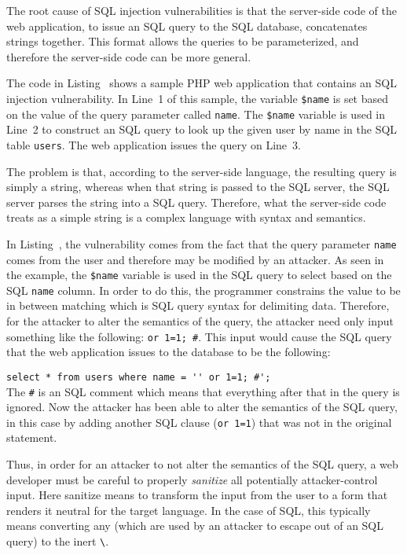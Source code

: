 The root cause of SQL injection vulnerabilities is that the
server-side code of the web application, to issue an SQL query to the
SQL database, concatenates strings together. This format allows the
queries to be parameterized, and therefore the server-side code can be
more general.



The code in Listing~ shows a sample PHP web
application that contains an SQL injection vulnerability. In Line~1 of
this sample, the variable \texttt{\$name} is set based on the value of
the query parameter called \texttt{name}. The \texttt{\$name} variable
is used in Line~2 to construct an SQL query to look up the given user
by name in the SQL table \texttt{users}. The web application issues
the query on Line~3.

The problem is that, according to the server-side language, the
resulting query is simply a string, whereas when that string is passed
to the SQL server, the SQL server parses the string into a SQL query.
Therefore, what the server-side code treats as a simple string is a
complex language with syntax and semantics. 

In Listing~, the vulnerability comes from the
fact that the query parameter \texttt{name} comes from the user and
therefore may be modified by an attacker. As seen in the example, the
\texttt{\$name} variable is used in the SQL query to select based on
the SQL \texttt{name} column. In order to do this, the programmer
constrains the value to be in between matching
\texttt{\textquotesingle} which is SQL query syntax for delimiting
data. Therefore, for the attacker to alter the semantics of the query,
the attacker need only input something like the following:
\texttt{\textquotesingle or 1=1; \#}. This input would cause the
SQL query that the web application issues to the database to be
the following:

\noindent\lstinline!select * from users where name = '' or 1=1; #';!
\\

The \texttt{\#} is an SQL comment which means that everything after
that in the query is ignored. Now the attacker has been able to alter
the semantics of the SQL query, in this case by adding another SQL
clause (\texttt{or 1=1}) that was not in the original statement.

Thus, in order for an attacker to not alter the semantics of the SQL
query, a web developer must be careful to properly \emph{sanitize} all
potentially attacker-control input. Here sanitize means to transform
the input from the user to a form that renders it neutral for the
target language. In the case of SQL, this typically means converting
any \texttt{\textquotesingle} (which are used by an attacker to escape
out of an SQL query) to the inert
\texttt{\textbackslash\textquotesingle}.


